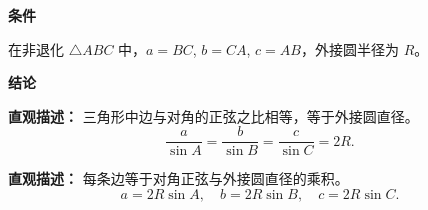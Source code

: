 \begin{statementbox}
	\textbf{\textcolor{CStatement}{条件}}
	\begin{description}[style=nextline, leftmargin=2.8em, labelsep=0.5em, itemsep=0.35em]
		\item[\textbf{\textcolor{CStatement}{条件1（三角形）：}}] 在非退化 $\triangle ABC$ 中，$a=BC$, $b=CA$, $c=AB$，外接圆半径为 $R$。
	\end{description}

	\textbf{\textcolor{CStatement}{结论}}
	\begin{description}[style=nextline, leftmargin=2.8em, labelsep=0.5em, itemsep=0.45em]
		\item[\textbf{\textcolor{CStatement}{结论一（正弦定理）：}}]
		      \textbf{\textcolor{CStatement}{直观描述：}} 三角形中边与对角的正弦之比相等，等于外接圆直径。
		      \[
			      \frac{a}{\sin A} = \frac{b}{\sin B} = \frac{c}{\sin C} = 2R.
		      \]

		\item[\textbf{\textcolor{CStatement}{推广结论（边角互化）：}}]
		      \textbf{\textcolor{CStatement}{直观描述：}} 每条边等于对角正弦与外接圆直径的乘积。
		      \[
			      a = 2R\sin A,\quad b = 2R\sin B,\quad c = 2R\sin C.
		      \]
	\end{description}

\end{statementbox}